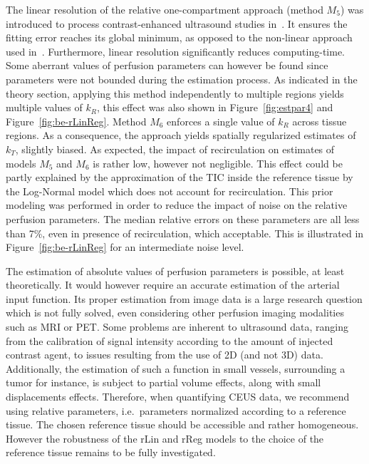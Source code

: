 The linear resolution of the relative one-compartment approach (method $M_5$) was introduced to process contrast-enhanced ultrasound studies in~\cite{Doury:2016fi}. It ensures the fitting error reaches its global minimum, as opposed to the non-linear approach used in~\cite{Doury:2017fz}. Furthermore, linear resolution significantly reduces computing-time. Some aberrant values of perfusion parameters can however be found since parameters were not bounded during the estimation process. As indicated in the theory section, applying this method independently to multiple regions yields multiple values of $k_R$, this effect was also shown in Figure~\ref{fig:estpar4} and Figure~\ref{fig:be-rLinReg}. Method $M_6$ enforces a single value of $k_R$ across tissue regions. As a consequence, the approach yields spatially regularized estimates of $k_T$, slightly biased. As expected, the impact of recirculation on estimates of models $M_5$ and $M_6$ is rather low, however not negligible. This effect could be partly explained by the approximation of the TIC inside the reference tissue by the Log-Normal model which does not account for recirculation. This prior modeling was performed in order to reduce the impact of noise on the relative perfusion parameters.
The median relative errors on these parameters are all less than 7\%, even in presence of recirculation, which acceptable. This is illustrated in Figure~\ref{fig:be-rLinReg} for an intermediate noise level. 

The estimation of absolute values of perfusion parameters is possible, at least theoretically. It would however require an accurate estimation of the arterial input function. Its proper estimation from image data is a large research question which is not fully solved, even considering other perfusion imaging modalities such as MRI or PET. Some problems are inherent to ultrasound data, ranging from the calibration of signal intensity according to the amount of injected contrast agent, to issues resulting from the use of 2D (and not 3D) data. Additionally, the estimation of such a function in small vessels, surrounding a tumor for instance, is subject to partial volume effects, along with small displacements effects. Therefore, when quantifying CEUS data, we recommend using relative parameters, i.e.~parameters normalized according to a reference tissue. The chosen reference tissue should be accessible and rather homogeneous. However the robustness of the rLin and rReg models to the choice of the reference tissue remains to be fully investigated.
 
